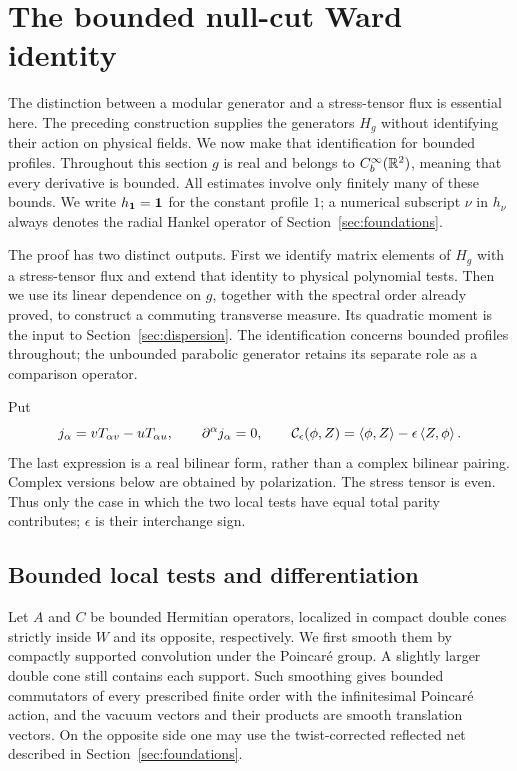 \section{The bounded null-cut Ward identity}
\label{sec:null-current}

The distinction between a modular generator and a stress-tensor flux is
essential here.  The preceding construction supplies the generators
$H_g$ without identifying their action on physical fields.  We now make
that identification for bounded profiles.  Throughout this section $g$
is real and belongs to $C_b^\infty(\mathbb R^2)$, meaning that every derivative
is bounded.  All estimates involve only finitely many of these bounds.
We write $h_{\mathbf1}=\mathbf 1$ for the constant profile $1$; a numerical
subscript $\nu$ in $h_\nu$ always denotes the radial Hankel operator of
Section~\ref{sec:foundations}.

The proof has two distinct outputs. First we identify matrix elements of
$H_g$ with a stress-tensor flux and extend that identity to physical
polynomial tests. Then we use its linear dependence on $g$, together
with the spectral order already proved, to construct a commuting
transverse measure. Its quadratic moment is the input to
Section~\ref{sec:dispersion}. The identification concerns bounded
profiles throughout; the unbounded parabolic generator retains its
separate role as a comparison operator.

Put
\begin{equation}\label{N:boost-current}
 j_\alpha=vT_{\alpha v}-uT_{\alpha u},\qquad
 \partial^\alpha j_\alpha=0,
 \qquad
 \mathcal C_\epsilon(\phi,Z)
   =\left\langle\phi,Z\right\rangle-\epsilon\left\langle Z,\phi\right\rangle.
\end{equation}
The last expression is a real bilinear form, rather than a complex
bilinear pairing.  Complex versions below are obtained by polarization.
The stress tensor is even.  Thus only the case in which the two local
tests have equal total parity contributes; $\epsilon$ is their
interchange sign.

\subsection{Bounded local tests and differentiation}

Let $A$ and $C$ be bounded Hermitian operators, localized in compact
double cones strictly inside $W$ and its opposite, respectively.  We
first smooth them by compactly supported convolution under the
Poincar\'e group.  A slightly larger double cone still contains each
support.  Such smoothing gives bounded commutators of every prescribed
finite order with the infinitesimal Poincar\'e action, and the vacuum
vectors and their products are smooth translation vectors.  On the
opposite side one may use the twist-corrected reflected net described
in Section~\ref{sec:foundations}.

